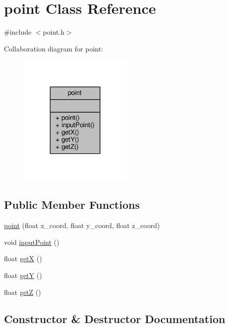 \hypertarget{classpoint}{}\section{point Class Reference}
\label{classpoint}


{\ttfamily \#include $<$point.\+h$>$}



Collaboration diagram for point\+:\nopagebreak
\begin{figure}[H]
\begin{center}
\leavevmode
\includegraphics[width=155pt]{classpoint__coll__graph}
\end{center}
\end{figure}
\subsection*{Public Member Functions}
\begin{DoxyCompactItemize}
\item 
\mbox{\hyperlink{classpoint_a390f735b876631979040ab611bdf36cb}{point}} (float x\+\_\+coord, float y\+\_\+coord, float z\+\_\+coord)
\item 
void \mbox{\hyperlink{classpoint_a91fdb8a1d1dded9dba1a3dc648d94c84}{input\+Point}} ()
\item 
float \mbox{\hyperlink{classpoint_a6cafeeff09ea34a0aac36273373b5814}{getX}} ()
\item 
float \mbox{\hyperlink{classpoint_ac5d9deb8d3dc8f0c64a1fa8d612b44f4}{getY}} ()
\item 
float \mbox{\hyperlink{classpoint_a18aa4ec7b86492b7c2af4d92a0d09a57}{getZ}} ()
\end{DoxyCompactItemize}


\subsection{Constructor \& Destructor Documentation}
\mbox{\label{classpoint_a390f735b876631979040ab611bdf36cb}} 

